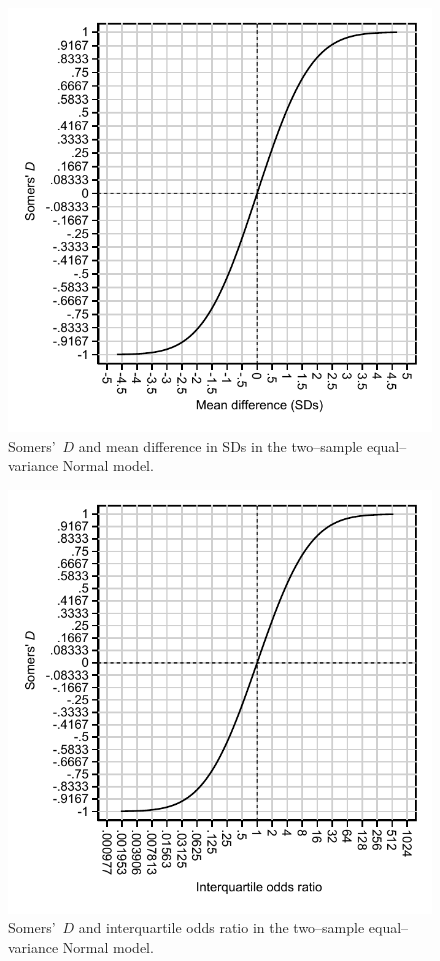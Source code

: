 \documentclass[a4paper,notitlepage]{article}      %
\begin{document}
\begin{figure}[htbp]
\caption{Somers'~$D$ and mean difference in SDs in the two--sample equal--variance Normal model.}
\label{figure:figseq3}
\includegraphics{delta.pdf}
\end{figure}

\begin{figure}[htbp]
\caption{Somers'~$D$ and interquartile odds ratio in the two--sample equal--variance Normal model.}
\label{figure:figseq5}
\includegraphics{iqor.pdf}
\end{figure}
\end{document}
